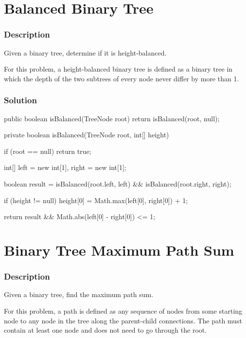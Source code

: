 \newpage

\section{Balanced Binary Tree} %

\subsubsection{Description}

Given a binary tree, determine if it is height-balanced.

For this problem, a height-balanced binary tree is defined as a binary tree in which the depth of the two subtrees of every node never differ by more than 1.

\subsubsection{Solution}

\begin{Code}
public boolean isBalanced(TreeNode root) {
    return isBalanced(root, null);
}

private boolean isBalanced(TreeNode root, int[] height) {
    if (root == null) {
        return true;
    }

    int[] left = new int[1], right = new int[1];

    boolean result = isBalanced(root.left, left) && isBalanced(root.right, right);

    if (height != null) {
        height[0] = Math.max(left[0], right[0]) + 1;
    }

    return result && Math.abs(left[0] - right[0]) <= 1;
}
\end{Code}

\newpage

\section{Binary Tree Maximum Path Sum} %

\subsubsection{Description}

Given a binary tree, find the maximum path sum.

For this problem, a path is defined as any sequence of nodes from some starting node to any node in the tree along the parent-child connections. The path must contain at least one node and does not need to go through the root.

